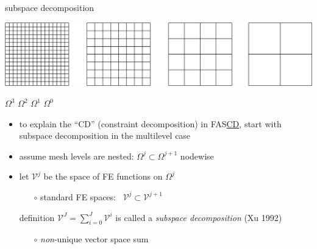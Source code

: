 \documentclass[svgnames,
               hyperref={colorlinks,citecolor=DeepPink4,linkcolor=FireBrick,urlcolor=Maroon},
               usepdftitle=false]  %
               {beamer}
\newcommand{\ds}{\displaystyle}
\begin{document}
\begin{frame}{subspace decomposition}

\hfill \includegraphics[height=0.12\textheight]{../talk-oxford/images/mg-grids.png}

{\footnotesize
\hfill $\Omega^3$ \hspace{8.5mm} $\Omega^2$ \hspace{8.5mm} $\Omega^1$ \hspace{8.5mm} $\Omega^0$ \hspace{1mm}
}

\begin{itemize}
\item to explain the ``CD'' (constraint decomposition) in FAS\underline{CD}, start with subspace decomposition in the multilevel case
\item assume mesh levels are nested: $\Omega^j \subset \Omega^{j+1}$ nodewise
\item let $\mathcal{V}^j$ be the space of FE functions on $\Omega^j$
    \begin{itemize}
    \item[$\circ$] standard FE spaces: \, $\mathcal{V}^j \subset \mathcal{V}^{j+1}$
    \end{itemize}
\begin{block}{definition}
$\ds \mathcal{V}^J = \sum_{i=0}^J \mathcal{V}^i$ \quad is called a \emph{subspace decomposition} (Xu 1992)
\end{block}
    \begin{itemize}
    \item[$\circ$] \emph{non}-unique vector space sum
    \end{itemize}
\end{itemize}
\end{frame}
\end{document}
